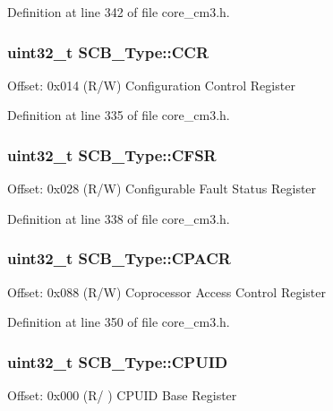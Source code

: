 Definition at line 342 of file core\+\_\+cm3.\+h.

\subsubsection[{\texorpdfstring{C\+CR}{CCR}}]{ uint32\+\_\+t S\+C\+B\+\_\+\+Type\+::\+C\+CR}\hypertarget{structSCB__Type_a6d273c6b90bad15c91dfbbad0f6e92d8}{}\label{structSCB__Type_a6d273c6b90bad15c91dfbbad0f6e92d8}
Offset\+: 0x014 (R/W) Configuration Control Register 

Definition at line 335 of file core\+\_\+cm3.\+h.

\subsubsection[{\texorpdfstring{C\+F\+SR}{CFSR}}]{ uint32\+\_\+t S\+C\+B\+\_\+\+Type\+::\+C\+F\+SR}\hypertarget{structSCB__Type_a2f94bf549b16fdeb172352e22309e3c4}{}\label{structSCB__Type_a2f94bf549b16fdeb172352e22309e3c4}
Offset\+: 0x028 (R/W) Configurable Fault Status Register 

Definition at line 338 of file core\+\_\+cm3.\+h.

\subsubsection[{\texorpdfstring{C\+P\+A\+CR}{CPACR}}]{ uint32\+\_\+t S\+C\+B\+\_\+\+Type\+::\+C\+P\+A\+CR}\hypertarget{structSCB__Type_af460b56ce524a8e3534173f0aee78e85}{}\label{structSCB__Type_af460b56ce524a8e3534173f0aee78e85}
Offset\+: 0x088 (R/W) Coprocessor Access Control Register 

Definition at line 350 of file core\+\_\+cm3.\+h.

\subsubsection[{\texorpdfstring{C\+P\+U\+ID}{CPUID}}]{ uint32\+\_\+t S\+C\+B\+\_\+\+Type\+::\+C\+P\+U\+ID}\hypertarget{structSCB__Type_afa7a9ee34dfa1da0b60b4525da285032}{}\label{structSCB__Type_afa7a9ee34dfa1da0b60b4525da285032}
Offset\+: 0x000 (R/ ) C\+P\+U\+ID Base Register 

